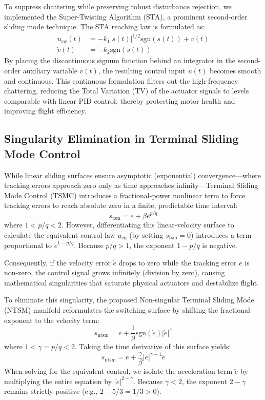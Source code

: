 To suppress chattering while preserving robust disturbance rejection, we implemented the Super-Twisting Algorithm (STA), a prominent second-order sliding mode technique. The STA reaching law is formulated as:
\begin{align}
u_{\text{sw}}(t) &= -k_{1} |s(t)|^{1/2} \text{sgn}(s(t)) + v(t) \\
\dot{v}(t) &= -k_{2} \text{sgn}(s(t))
\end{align}
By placing the discontinuous signum function behind an integrator in the second-order auxiliary variable $v(t)$, the resulting control input $u(t)$ becomes smooth and continuous. This continuous formulation filters out the high-frequency chattering, reducing the Total Variation (TV) of the actuator signals to levels comparable with linear PID control, thereby protecting motor health and improving flight efficiency.

\subsection{Singularity Elimination in Terminal Sliding Mode Control}
While linear sliding surfaces ensure asymptotic (exponential) convergence—where tracking errors approach zero only as time approaches infinity—Terminal Sliding Mode Control (TSMC) introduces a fractional-power nonlinear term to force tracking errors to reach absolute zero in a finite, predictable time interval:
\begin{equation}
s_{\text{tsm}} = e + \beta \dot{e}^{p/q}
\end{equation}
where $1 < p/q < 2$. However, differentiating this linear-velocity surface to calculate the equivalent control law $u_{\text{eq}}$ (by setting $\dot{s}_{\text{tsm}} = 0$) introduces a term proportional to $\dot{e}^{1 - p/q}$. Because $p/q > 1$, the exponent $1 - p/q$ is negative. 

Consequently, if the velocity error $\dot{e}$ drops to zero while the tracking error $e$ is non-zero, the control signal grows infinitely (division by zero), causing mathematical singularities that saturate physical actuators and destabilize flight.

To eliminate this singularity, the proposed Non-singular Terminal Sliding Mode (NTSM) manifold reformulates the switching surface by shifting the fractional exponent to the velocity term:
\begin{equation}
s_{\text{ntsm}} = e + \frac{1}{\beta} \text{sgn}(\dot{e}) |\dot{e}|^{\gamma}
\end{equation}
where $1 < \gamma = p/q < 2$. Taking the time derivative of this surface yields:
\begin{equation}
\dot{s}_{\text{ntsm}} = \dot{e} + \frac{\gamma}{\beta} |\dot{e}|^{\gamma - 1} \ddot{e}
\end{equation}
When solving for the equivalent control, we isolate the acceleration term $\ddot{e}$ by multiplying the entire equation by $|\dot{e}|^{2-\gamma}$. Because $\gamma < 2$, the exponent $2 - \gamma$ remains strictly positive (e.g., $2 - 5/3 = 1/3 > 0$). 

